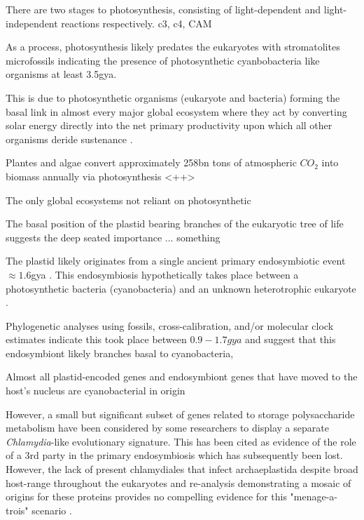 There are two stages to photosynthesis, consisting of light-dependent and light-independent reactions respectively.
c3, c4, CAM


As a process, photosynthesis likely predates the eukaryotes with stromatolites microfossils 
indicating the presence of photosynthetic cyanbobacteria like organisms at least 3.5gya.













This is due to photosynthetic organisms (eukaryote and bacteria) forming the basal 
link in almost every major global ecosystem where they act by converting solar energy 
directly into the net primary productivity upon which all other organisms 
deride sustenance \citep{Reyes-Prieto2007}.



Plantes and algae convert approximately 258bn tons of atmospheric \(CO_{2}\) into biomass
annually via photosynthesis \citep{}<++>




The only global ecosystems not reliant on photosynthetic 




The basal position of the plastid bearing branches of the eukaryotic tree of life %
suggests the deep seated importance ... something \citep{Yoon2004}


The plastid likely originates from a single ancient primary endosymbiotic event \(\approx 1.6\)gya \citep{Yoon2004}.
This endosymbiosis hypothetically takes place between a photosynthetic bacteria (cyanobacteria) and
an unknown heterotrophic eukaryote \citep{Reyes-Prieto2007}.


Phylogenetic analyses using fossils, cross-calibration, and/or molecular clock estimates indicate 
this took place between \(0.9-1.7gya\) \citep{Yoon2004,Parfrey2011,Shih2013,McFadden2014} and 
suggest that this endosymbiont likely branches basal to cyanobacteria, 



Almost all plastid-encoded genes and endosymbiont genes that have moved to the host's nucleus are 
cyanobacterial in origin 


However, a small but significant subset of genes related to storage polysaccharide metabolism have been 
considered by some researchers to display a separate \textit{Chlamydia}-like evolutionary signature.
This has been cited as evidence of the role of a 3rd party in the primary endosymbiosis which has subsequently
been lost.  However, the lack of present chlamydiales that infect archaeplastida despite broad host-range throughout 
the eukaryotes and re-analysis demonstrating a mosaic of origins for these proteins provides no compelling
evidence for this "menage-a-trois" scenario \citep{Domman2015}.




